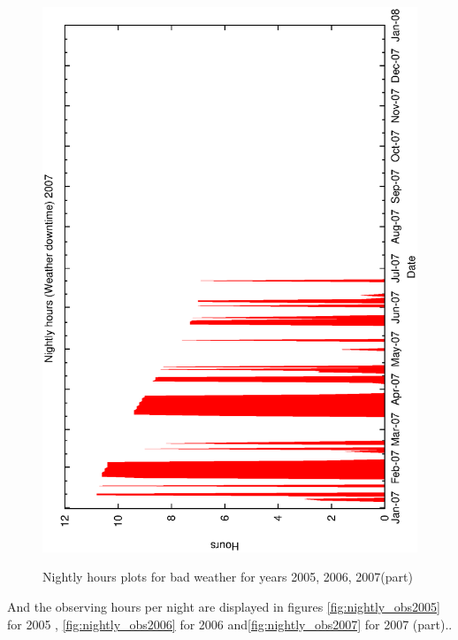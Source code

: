 {{\begin{figure}[htbp]
\begin{center}
{    \includegraphics[scale=0.4, angle=-90]{figures/ecs/met_nightly_stats_weather2007.eps}
  }
\end{center}
\caption{Nightly hours plots for bad weather for years 2005, 2006, 2007(part)}  
\label{fig:met_nightly_weather}
\end{figure}

And the observing hours per night are displayed in figures \ref{fig:nightly_obs2005} for 2005 , \ref{fig:nightly_obs2006} for 2006  and\ref{fig:nightly_obs2007} for 2007 (part)..

}}
